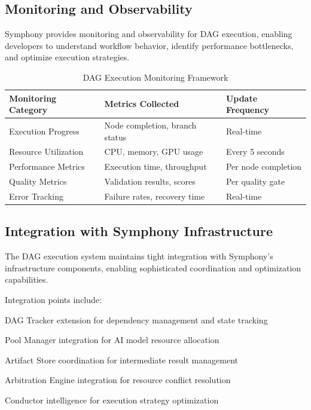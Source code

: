 \subsection*{Monitoring and Observability}

Symphony provides monitoring and observability for DAG execution, enabling developers to understand workflow behavior, identify performance bottlenecks, and optimize execution strategies.

\begin{table}[ht]
\centering
\begin{tabular}{@{}lll@{}}
\toprule
\textbf{Monitoring Category} & \textbf{Metrics Collected} & \textbf{Update Frequency} \\
\midrule
Execution Progress & Node completion, branch status & Real-time \\
Resource Utilization & CPU, memory, GPU usage & Every 5 seconds \\
Performance Metrics & Execution time, throughput & Per node completion \\
Quality Metrics & Validation results, scores & Per quality gate \\
Error Tracking & Failure rates, recovery time & Real-time \\
\bottomrule
\end{tabular}
\caption{DAG Execution Monitoring Framework}
\end{table}

\subsection*{Integration with Symphony Infrastructure}

The DAG execution system maintains tight integration with Symphony's infrastructure components, enabling sophisticated coordination and optimization capabilities.

Integration points include:

\begin{compactlist}
    \item DAG Tracker extension for dependency management and state tracking
    \item Pool Manager integration for AI model resource allocation
    \item Artifact Store coordination for intermediate result management
    \item Arbitration Engine integration for resource conflict resolution
    \item Conductor intelligence for execution strategy optimization
\end{compactlist}


